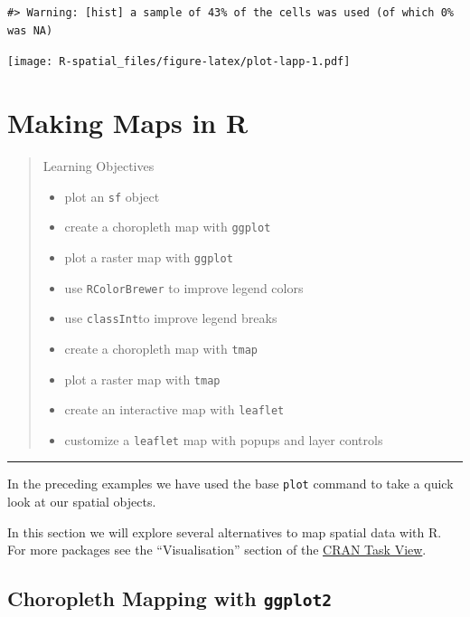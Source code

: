 \documentclass[
]{book}
\providecommand{\tightlist}{%
  \setlength{\itemsep}{0pt}\setlength{\parskip}{0pt}}
\begin{document}
\begin{verbatim}
#> Warning: [hist] a sample of 43% of the cells was used (of which 0% was NA)
\end{verbatim}

\texttt{[image: R-spatial\_files/figure-latex/plot-lapp-1.pdf]}

\hypertarget{mapping}{%
\chapter{Making Maps in R}\label{mapping}}

\begin{quote}
Learning Objectives

\begin{itemize}
\tightlist
\item
  plot an \texttt{sf} object
\item
  create a choropleth map with \texttt{ggplot}
\item
  plot a raster map with \texttt{ggplot}
\item
  use \texttt{RColorBrewer} to improve legend colors
\item
  use \texttt{classInt}to improve legend breaks
\item
  create a choropleth map with \texttt{tmap}
\item
  plot a raster map with \texttt{tmap}
\item
  create an interactive map with \texttt{leaflet}
\item
  customize a \texttt{leaflet} map with popups and layer controls
\end{itemize}
\end{quote}

\begin{center}\rule{0.5\linewidth}{0.5pt}\end{center}

In the preceding examples we have used the base \texttt{plot} command to take a quick look at our spatial objects.

In this section we will explore several alternatives to map spatial data with R. For more packages see the ``Visualisation'' section of the \href{https://cran.r-project.org/web/views/Spatial.html}{CRAN Task View}.

\hypertarget{choropleth-mapping-with-ggplot2}{%
\section{\texorpdfstring{Choropleth Mapping with \texttt{ggplot2}}{Choropleth Mapping with ggplot2}}\label{choropleth-mapping-with-ggplot2}}
\end{document}
